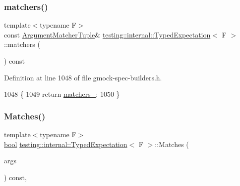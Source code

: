 \subsubsection{\texorpdfstring{matchers()}{matchers()}}
{\footnotesize\ttfamily template$<$typename F$>$ \\
const \hyperlink{classtesting_1_1internal_1_1TypedExpectation_a8f10e3906761cc5c10fa3561c6e8938e}{Argument\+Matcher\+Tuple}\& \hyperlink{classtesting_1_1internal_1_1TypedExpectation}{testing\+::internal\+::\+Typed\+Expectation}$<$ F $>$\+::matchers (\begin{DoxyParamCaption}{ }\end{DoxyParamCaption}) const\hspace{0.3cm}{\ttfamily [inline]}}



Definition at line 1048 of file gmock-\/spec-\/builders.\+h.


\begin{DoxyCode}
1048                                                \{
1049     \textcolor{keywordflow}{return} \hyperlink{classtesting_1_1internal_1_1TypedExpectation_a40c442a0e8fffc8bf94611a8130998bf}{matchers\_};
1050   \}
\end{DoxyCode}
\mbox{\label{classtesting_1_1internal_1_1TypedExpectation_a010336f587859d990b718cd74f13e617}} 
\subsubsection{\texorpdfstring{Matches()}{Matches()}}
{\footnotesize\ttfamily template$<$typename F$>$ \\
\hyperlink{classbool}{bool} \hyperlink{classtesting_1_1internal_1_1TypedExpectation}{testing\+::internal\+::\+Typed\+Expectation}$<$ F $>$\+::Matches (\begin{DoxyParamCaption}\item[{const \hyperlink{classtesting_1_1internal_1_1TypedExpectation_a9a91379262d101f435809ba4556d14fa}{Argument\+Tuple} \&}]{args }\end{DoxyParamCaption}) const\hspace{0.3cm}{\ttfamily [inline]}, {\ttfamily [private]}}




